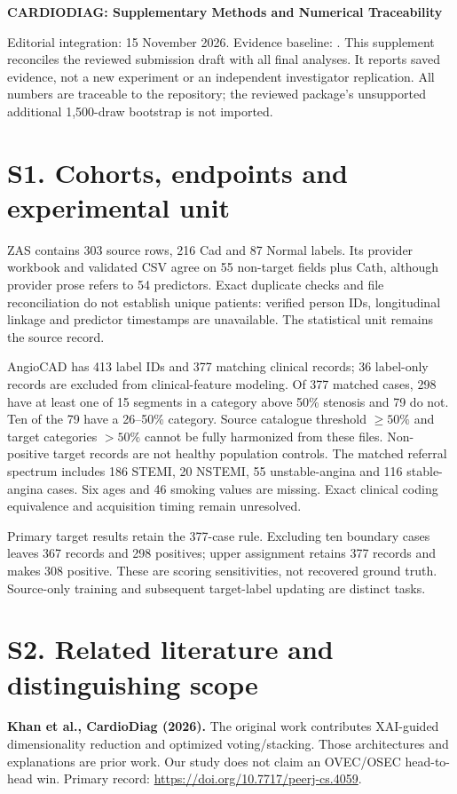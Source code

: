 \documentclass[10pt]{article}
\let\originalsection\section
\renewcommand\section{\Needspace{6\baselineskip}\originalsection}
\begin{document}
\normalsize

\begin{center}\textbf{CARDIODIAG: Supplementary Methods and Numerical Traceability}\end{center}
Editorial integration: 15 November 2026. Evidence baseline: .
This supplement reconciles the reviewed submission draft with all final analyses. It reports saved evidence, not a new experiment or an independent investigator replication. All numbers are traceable to the repository; the reviewed package's unsupported additional 1,500-draw bootstrap is not imported.

\section*{S1. Cohorts, endpoints and experimental unit}
ZAS contains 303 source rows, 216 Cad and 87 Normal labels. Its provider workbook and validated CSV agree on 55 non-target fields plus Cath, although provider prose refers to 54 predictors. Exact duplicate checks and file reconciliation do not establish unique patients: verified person IDs, longitudinal linkage and predictor timestamps are unavailable. The statistical unit remains the source record.

AngioCAD has 413 label IDs and 377 matching clinical records; 36 label-only records are excluded from clinical-feature modeling. Of 377 matched cases, 298 have at least one of 15 segments in a category above 50\% stenosis and 79 do not. Ten of the 79 have a 26--50\% category. Source catalogue threshold $\geq50\%$ and target categories $>50\%$ cannot be fully harmonized from these files. Non-positive target records are not healthy population controls. The matched referral spectrum includes 186 STEMI, 20 NSTEMI, 55 unstable-angina and 116 stable-angina cases. Six ages and 46 smoking values are missing. Exact clinical coding equivalence and acquisition timing remain unresolved.

Primary target results retain the 377-case rule. Excluding ten boundary cases leaves 367 records and 298 positives; upper assignment retains 377 records and makes 308 positive. These are scoring sensitivities, not recovered ground truth. Source-only training and subsequent target-label updating are distinct tasks.

\section*{S2. Related literature and distinguishing scope}
\textbf{Khan et al., CardioDiag (2026).} The original work contributes XAI-guided dimensionality reduction and optimized voting/stacking. Those architectures and explanations are prior work. Our study does not claim an OVEC/OSEC head-to-head win. Primary record: \url{https://doi.org/10.7717/peerj-cs.4059}.
\end{document}
